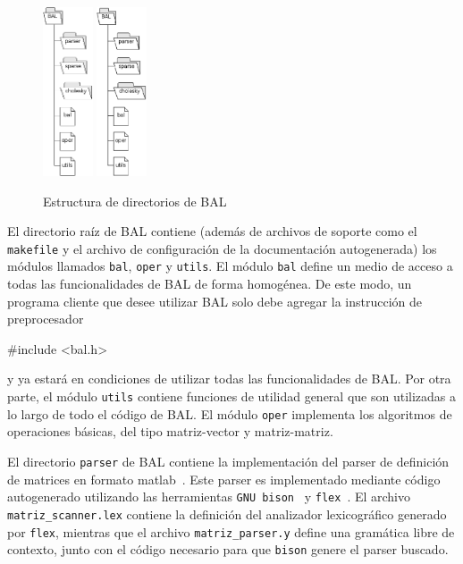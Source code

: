 \documentclass{cacic06}
\begin{document}
\begin{figure}
  \vspace{-20pt}
  \begin{center}
	\ifpdf
		\includegraphics[height=5cm]{img/estructura.png}
	\else
		\includegraphics[height=5cm]{img/estructura.eps}
	\fi
  \end{center}
  \vspace{-20pt}
  \caption{Estructura de directorios de BAL}
  \vspace{-40pt}
\end{figure}
El directorio raíz de BAL contiene (además de archivos de soporte como el \texttt{makefile} y el archivo de configuración de la documentación autogenerada) los módulos llamados \texttt{bal}, \texttt{oper} y \texttt{utils}. El módulo \texttt{bal} define un medio de acceso a todas las funcionalidades de BAL de forma homogénea. De este modo, un programa cliente que desee utilizar BAL solo debe agregar la instrucción de preprocesador
\begin{SmallVerbatim}
#include <bal.h>
\end{SmallVerbatim}
y ya estará en condiciones de utilizar todas las funcionalidades de BAL. Por otra parte, el módulo \texttt{utils} contiene funciones de utilidad general que son utilizadas a lo largo de todo el código de BAL. El módulo \texttt{oper} implementa los algoritmos de operaciones básicas, del tipo matriz-vector y matriz-matriz.

El directorio \texttt{parser} de BAL contiene  la implementación del parser de definición de matrices en formato matlab~\cite{matlab}. Este parser es implementado mediante código autogenerado utilizando las herramientas \texttt{GNU bison}~\cite{bison} y \texttt{flex}~\cite{flex}. El archivo \texttt{matriz\_scanner.lex} contiene la definición del analizador lexicográfico generado por \texttt{flex}, mientras que el archivo \texttt{matriz\_parser.y} define una gramática libre de contexto, junto con el código necesario para que \texttt{bison} genere el parser buscado.
\end{document}
